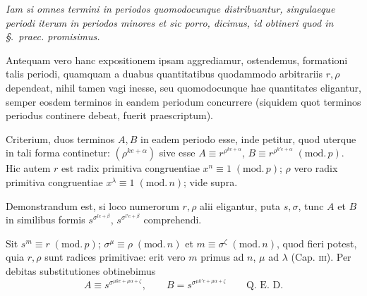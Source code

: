 \emph{Iam si omnes termini in periodos quomodocunque distribuantur, singulaeque periodi iterum in periodos minores et sic porro, dicimus, id obtineri quod in \S.\ praec. promisimus.}

Antequam vero hanc expositionem ipsam aggrediamur, ostendemus, formationi talis periodi, quamquam a duabus quantitatibus quodammodo arbitrariis $r,\rho$ dependeat, nihil tamen vagi inesse, seu quomodocunque hae quantitates eligantur, semper eosdem terminos in eandem periodum concurrere (siquidem quot terminos periodus continere debeat, fuerit praescriptum).

Criterium, duos terminos $A,B$ in eadem periodo esse, inde petitur, quod uterque in tali forma continetur: $(\rho^{ke+\alpha})$ sive esse $A\equiv r^{\rho^{ke+\alpha}}$, $B\equiv r^{\rho^{k'e+\alpha}}\;(\mathrm{mod.}\,p)$. Hic autem $r$ est radix primitiva congruentiae $x^n\equiv1\;(\mathrm{mod.}\,p)$; $\rho$ vero radix primitiva congruentiae $x^\lambda\equiv1\;(\mathrm{mod.}\,n)$; vide supra.

Demonstrandum est, si loco numerorum $r,\rho$ alii eligantur, puta $s,\sigma$, tunc $A$ et $B$ in similibus formis $s^{\sigma^{le+\beta}}$, $s^{\sigma^{l'e+\beta}}$ comprehendi.

Sit $s^m\equiv r\;(\mathrm{mod.}\,p)$; $\sigma^\mu\equiv\rho\;(\mathrm{mod.}\,n)$ et $m\equiv\sigma^\zeta\;(\mathrm{mod.}\,n)$, quod fieri potest, quia $r,\rho$ sunt radices primitivae: erit vero $m$ primus ad $n$, $\mu$ ad $\lambda$ (Cap. \textsc{iii}). Per debitas substitutiones obtinebimus
\[
A\equiv s^{\sigma^{\mu ke+\mu\alpha+\zeta}},\qquad B=s^{\sigma^{\mu k'e+\mu\alpha+\zeta}}\qquad\text{Q. E. D.}
\]
